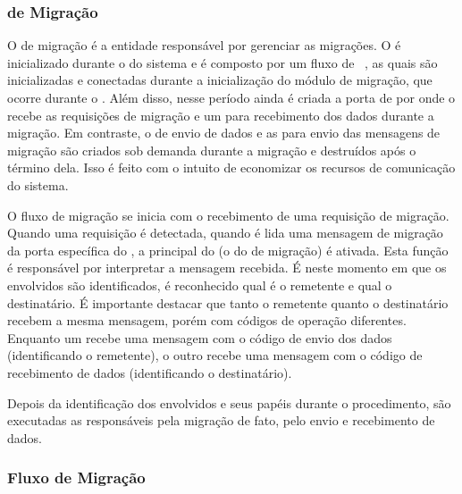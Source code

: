 \subsubsection{\Daemon de Migração}

O \daemon de migração é a entidade responsável por gerenciar as migrações. O \daemon é inicializado durante o \boot do sistema e é composto por um fluxo de \tasks~\cite{souto:thesis}, as quais são inicializadas e conectadas durante a inicialização do módulo de migração, que ocorre durante o \boot. Além disso, nesse período ainda é criada a porta de \mailbox por onde o \daemon recebe as requisições de migração e um \portal {} para recebimento dos dados durante a migração. Em contraste, o \portal de envio de dados e as \mailboxes para envio das mensagens de migração são criados sob demanda durante a migração e destruídos após o término dela. Isso é feito com o intuito de economizar os recursos de comunicação do sistema.
    
O fluxo de migração se inicia com o recebimento de uma requisição de migração. Quando uma requisição é detectada, \ie quando é lida uma mensagem de migração da porta específica do \daemon, a \task principal do \daemon (o \handler do \daemon de migração) é ativada. Esta função é responsável por interpretar a mensagem recebida. É neste momento em que os \clusters envolvidos são identificados, \ie é reconhecido qual é o \cluster remetente e qual o \cluster destinatário. É importante destacar que tanto o \cluster remetente quanto o destinatário recebem a mesma mensagem, porém com códigos de operação diferentes. Enquanto um recebe uma mensagem com o código de envio dos dados (identificando o remetente), o outro recebe uma mensagem com o código de recebimento de dados (identificando o destinatário).

Depois da identificação dos \clusters envolvidos e seus papéis durante o procedimento, são executadas as \tasks responsáveis pela migração de fato, \ie pelo envio e recebimento de dados.


\subsubsection{Fluxo de Migração}\label{sec.fluxo-migracao}

